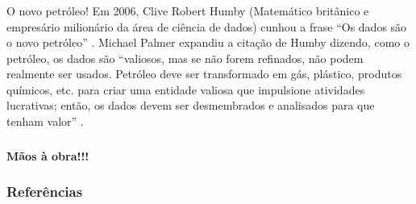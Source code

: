 \documentclass[12pt]{beamer}
\begin{document}
\begin{frame}{}
\frametitle{}
\begin{block}{O novo petróleo!}
\justifying
Em 2006, Clive Robert Humby (Matemático britânico e empresário milionário da área de ciência de dados) cunhou a frase ``Os dados são o novo petróleo'' \cite{Charles}. Michael Palmer expandiu a citação de Humby dizendo, como o petróleo, os dados são ``valiosos, mas se não forem refinados, não podem realmente ser usados. Petróleo deve ser transformado em gás, plástico, produtos químicos, etc. para criar uma entidade valiosa que impulsione atividades lucrativas; então, os dados devem ser desmembrados e analisados para que tenham valor'' \cite{Palmer, Haupt, Firican}.
\end{block}
\end{frame}

\begin{frame}{}
\frametitle{}
\begin{block}{}
\centering
{\Large \bf{Mãos à obra!!!}}
\end{block}
\end{frame}


\begin{frame}[allowframebreaks]
\frametitle{\bf Referências}
\printbibliography
\end{frame}
\end{document}
